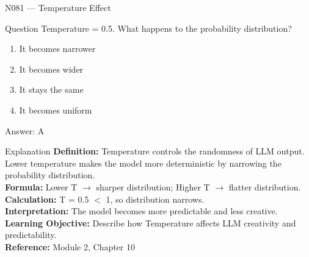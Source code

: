 \documentclass[aspectratio=169,8pt]{beamer}
\begin{document}
	\begin{frame}{N081 --- Temperature Effect}
		\begin{block}{Question}
			Temperature = 0.5. What happens to the probability distribution?
			\begin{enumerate}
				\item It becomes narrower
				\item It becomes wider
				\item It stays the same
				\item It becomes uniform
			\end{enumerate}
		\end{block}
		\begin{exampleblock}{Answer: A}\end{exampleblock}
		\begin{block}{Explanation}
			\textbf{Definition:} Temperature controls the randomness of LLM output. Lower temperature makes the model more deterministic by narrowing the probability distribution.\\
			\textbf{Formula:} Lower T $\rightarrow$ sharper distribution; Higher T $\rightarrow$ flatter distribution.\\
			\textbf{Calculation:} T = 0.5 $<$ 1, so distribution narrows.\\
			\textbf{Interpretation:} The model becomes more predictable and less creative.\\
			\textbf{Learning Objective:} Describe how Temperature affects LLM creativity and predictability.\\
			\textbf{Reference:} Module 2, Chapter 10
		\end{block}
	\end{frame}
	
\end{document}
